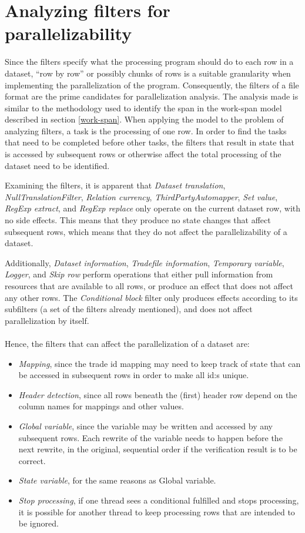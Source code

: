 \section{Analyzing filters for parallelizability}
Since the filters specify what the processing program should do to each row in a dataset, ``row by row'' or possibly chunks of rows is a suitable
granularity when implementing the parallelization of the program. Consequently, the filters of a file format are the prime candidates
for parallelization analysis. The analysis made is similar to the methodology used to identify the span in the work-span model described in
section \ref{work-span}. When applying the model to the problem of analyzing filters, a task is the processing of one row. In order to find
the tasks that need to be completed before other tasks, the filters that result in state that is accessed by subsequent rows or otherwise
affect the total processing of the dataset need to be identified.

Examining the filters, it is apparent that \textit{Dataset translation}, \textit{NullTranslationFilter}, \textit{Relation currency},
\textit{ThirdPartyAutomapper}, \textit{Set value}, \textit{RegExp extract}, and \textit{RegExp replace} only operate on the current dataset row, with no side effects.
This means that they produce no state changes that affect subsequent rows, which means that they do not affect the parallelizability of a dataset.

Additionally, \textit{Dataset information}, \textit{Tradefile information}, \textit{Temporary variable}, \textit{Logger}, and \textit{Skip row} perform
operations that either pull information from resources that are available to all rows, or produce an effect that does not affect any other rows.
The \textit{Conditional block} filter only produces effects according to its subfilters (a set of the filters already mentioned), and does not affect parallelization by itself.
\\\\
Hence, the filters that can affect the parallelization of a dataset are:
\begin{itemize}
  \item \textit{Mapping}, since the trade id mapping may need to keep track of state that can be accessed in subsequent rows in order to make all id:s unique.
  \item \textit{Header detection}, since all rows beneath the (first) header row depend on the column names for mappings and other values.
  \item \textit{Global variable}, since the variable may be written and accessed by any subsequent rows. Each rewrite of the variable needs to happen before the next rewrite,
    in the original, sequential order if the verification result is to be correct.
  \item \textit{State variable}, for the same reasons as Global variable.
  \item \textit{Stop processing}, if one thread sees a conditional fulfilled and stops processing, it is possible for another thread to keep processing rows that are intended
    to be ignored.
\end{itemize}

